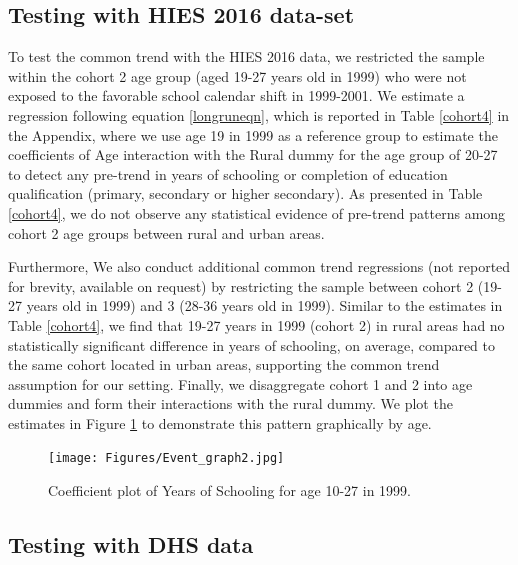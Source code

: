 \documentclass[12pt,letterpaper]{article}
\newcommand{\0}{\ensuremath{\mbox{\boldmath $0$}}}
\begin{document}
\subsection{Testing with HIES 2016 data-set\label{subsec.cohort_trend_HIES}}
To test the common trend with the HIES 2016 data, we restricted the sample within the cohort 2 age group (aged 19-27 years old in 1999) who were not exposed to the favorable school calendar shift in 1999-2001. We estimate a regression following equation \ref{longruneqn}, which is reported in Table \ref{cohort4} in the Appendix, where we use age 19 in 1999 as a reference group to estimate the coefficients of Age interaction with the Rural dummy for the age group of 20-27 to detect any pre-trend in years of schooling or completion of education qualification (primary, secondary or higher secondary). As presented in Table \ref{cohort4}, we do not observe any statistical evidence of pre-trend patterns among cohort 2 age groups between rural and urban areas. 

Furthermore, We also conduct additional common trend regressions (not reported for brevity, available on request) by restricting the sample between cohort 2 (19-27 years old in 1999) and 3 (28-36 years old in 1999). Similar to the estimates in Table \ref{cohort4}, we find that 19-27 years in 1999 (cohort 2) in rural areas had no statistically significant difference in years of schooling, on average, compared to the same cohort located in urban areas, supporting the common trend assumption for our setting. Finally, we disaggregate cohort 1 and 2 into age dummies and form their interactions with the rural dummy. We plot the estimates in Figure \ref{event_graph} to demonstrate this pattern graphically by age.  

\begin{figure}[h!]
\centering
\texttt{[image: Figures/Event\_graph2.jpg]}\\
\caption{Coefficient plot of Years of Schooling for age 10-27 in 1999.\protect\footnotemark}
\label{event_graph}
\end{figure}

\subsection{Testing with DHS data\label{subsec.cohort_trend_DHS}}
\end{document}
